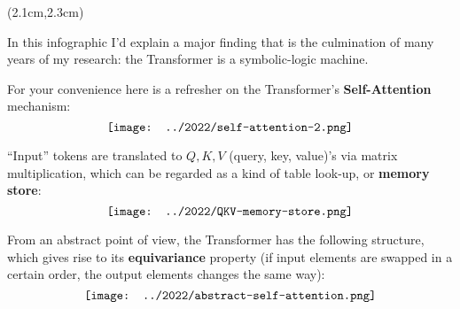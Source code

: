 \begin{preview}

\cc{
\title{\vspace{-1.5cm} \bfseries\color{blue}{\LARGE Transformer 是一种逻辑结构}}
}{
\title{\vspace{-1.5cm} \bfseries\color{blue}{\LARGE Transformer as Logic-Base}}
}

\date{\vspace{-2cm}} %

\maketitle

\setcounter{section}{-1}

\begin{textblock*}{5cm}(2.1cm,2.3cm) %
{}
\end{textblock*}

\begin{minipage}{\textwidth}
\setlength{\parskip}{0.4\baselineskip}

In this infographic I'd explain a major finding that is the culmination of many years of my research: the Transformer is a symbolic-logic machine.

For your convenience here is a refresher on the Transformer's \textbf{Self-Attention} mechanism:
\begin{equation}
\vcenter{\hbox{\texttt{[image: ../2022/self-attention-2.png]}}}
\end{equation}

``Input'' tokens are translated to $Q,K,V$ (query, key, value)'s via matrix multiplication, which can be regarded as a kind of table look-up, or \textbf{memory store}:
\begin{equation}
\vcenter{\hbox{\texttt{[image: ../2022/QKV-memory-store.png]}}}
\end{equation}

From an abstract point of view, the Transformer has the following structure, which gives rise to its \textbf{equivariance} property (if input elements are swapped in a certain order, the output elements changes the same way):
\begin{equation}
\vcenter{\hbox{\texttt{[image: ../2022/abstract-self-attention.png]}}}
\end{equation}


\end{minipage}
\end{preview}
